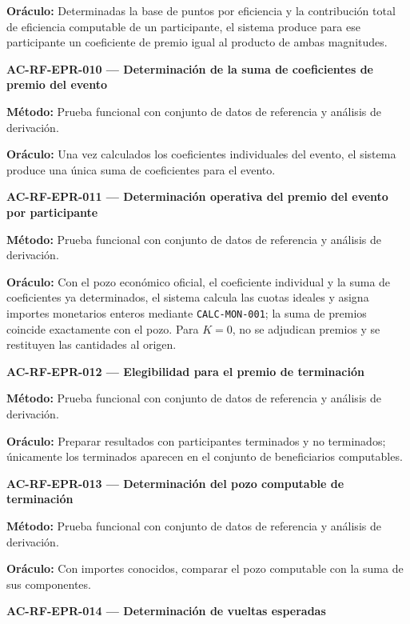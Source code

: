 \documentclass[10pt,letterpaper]{article}
\begin{document}
\textbf{Oráculo:} Determinadas la base de puntos por eficiencia y la contribución total de eficiencia computable de un participante, el sistema produce para ese participante un coeficiente de premio igual al producto de ambas magnitudes.\par\vspace{0.45em}
\noindent\textbf{AC-RF-EPR-010 --- Determinación de la suma de coeficientes de premio del evento}\par
\textbf{Método:} Prueba funcional con conjunto de datos de referencia y análisis de derivación.\par
\textbf{Oráculo:} Una vez calculados los coeficientes individuales del evento, el sistema produce una única suma de coeficientes para el evento.\par\vspace{0.45em}
\noindent\textbf{AC-RF-EPR-011 --- Determinación operativa del premio del evento por participante}\par
\textbf{Método:} Prueba funcional con conjunto de datos de referencia y análisis de derivación.\par
\textbf{Oráculo:} Con el pozo económico oficial, el coeficiente individual y la suma de coeficientes ya determinados, el sistema calcula las cuotas ideales y asigna importes monetarios enteros mediante \texttt{CALC-MON-001}; la suma de premios coincide exactamente con el pozo. Para $K=0$, no se adjudican premios y se restituyen las cantidades al origen.\par\vspace{0.45em}
\noindent\textbf{AC-RF-EPR-012 --- Elegibilidad para el premio de terminación}\par
\textbf{Método:} Prueba funcional con conjunto de datos de referencia y análisis de derivación.\par
\textbf{Oráculo:} Preparar resultados con participantes terminados y no terminados; únicamente los terminados aparecen en el conjunto de beneficiarios computables.\par\vspace{0.45em}
\noindent\textbf{AC-RF-EPR-013 --- Determinación del pozo computable de terminación}\par
\textbf{Método:} Prueba funcional con conjunto de datos de referencia y análisis de derivación.\par
\textbf{Oráculo:} Con importes conocidos, comparar el pozo computable con la suma de sus componentes.\par\vspace{0.45em}
\noindent\textbf{AC-RF-EPR-014 --- Determinación de vueltas esperadas}\par
\end{document}
